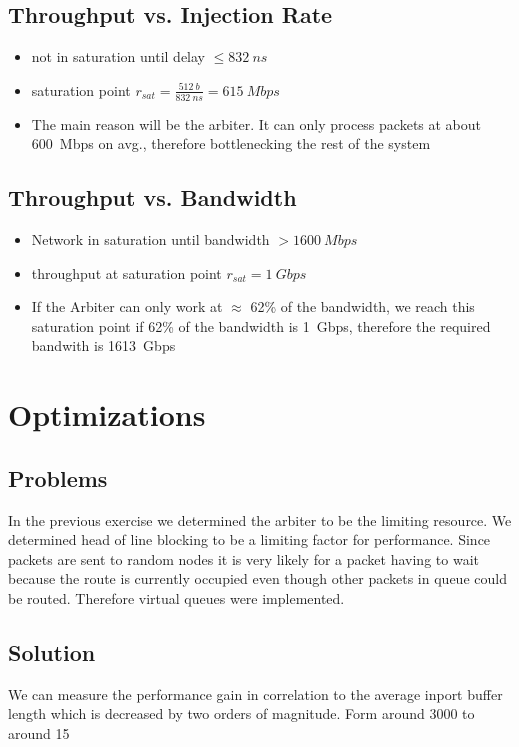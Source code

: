 \documentclass[]{scrartcl}
\begin{document}
    \subsection{Throughput vs. Injection Rate}
    \begin{itemize}
        \item not in saturation until delay $\leq \SI{832}{ns}$
        \item saturation point $r_{sat} = \frac{\SI{512}{b}}{\SI{832}{ns}} = \SI{615}{Mbps}$
        \item The main reason will be the arbiter. It can only process packets at about \SI{600}{Mbps} on avg., therefore bottlenecking the rest of the system
    \end{itemize}
    \subsection{Throughput vs. Bandwidth}
    \begin{itemize}
        \item Network in saturation until bandwidth $> \SI{1600}{Mbps}$
        \item throughput at saturation point $r_{sat} = \SI{1}{Gbps}$
        \item If the Arbiter can only work at $\approx$ 62\% of the bandwidth, we reach this saturation point if 62\% of the bandwidth is \SI{1}{Gbps}, therefore the required bandwith is \SI{1613}{Gbps}
    \end{itemize}
\section{Optimizations}
\subsection{Problems}
In the previous exercise we determined the arbiter to be the limiting resource.
We determined head of line blocking to be a limiting factor for performance.
Since packets are sent to random nodes it is very likely for a packet having to
wait because the route is currently occupied even though other packets in queue
could be routed.
Therefore virtual queues were implemented.

\subsection{Solution}
We can measure the performance gain in correlation to the average inport buffer
length which is decreased by two orders of magnitude. Form around 3000 to around
15
\end{document}

